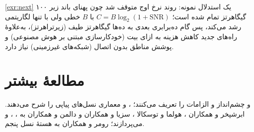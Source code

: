\documentclass[11pt,a4paper]{article}
\begin{document}
\begin{solutionbox}{\ref{exr:next}}
یک استدلال نمونه: روند نرخ اوج متوقف شد چون پهنای باند زیر ۱۰۰ گیگاهرتز تمام شده است؛ $C = B\log_2(1+\mathrm{SNR})$ با $B$ خطی ولی با  تنها
لگاریتمی رشد می‌کند، پس گام ده‌برابری بعدی به ده‌ها گیگاهرتز طیف (زیرتراهرتز)، به‌علاوهٔ راه‌های جدید کاهش هزینه به ازای بیت (خودکارسازی مبتنی بر
هوش مصنوعی) و پوشش مناطق بدون اتصال (شبکه‌های غیرزمینی) نیاز دارد.
\end{solutionbox}

\section{مطالعهٔ بیشتر}
 \cite{itu2015m2083} و  \cite{itu2017m2410} چشم‌انداز و الزامات  را تعریف می‌کنند؛  \cite{ts23002}،
 \cite{ts23401} و  \cite{ts23501} معماری نسل‌های پیاپی را شرح می‌دهند. ابرشپخر و همکاران \cite{eberspaecher2009gsm}، هولما و
توسکالا \cite{holma2010wcdma}، سزیا و همکاران \cite{sesia2011lte} و دالمن و همکاران \cite{dahlman2020nr} به ، ،  و 
می‌پردازند؛ رومر و همکاران \cite{rommer2020core} به هستهٔ نسل پنجم.

\begin{latin}
\printbibliography[heading=subbibliography,title={References}]
\end{latin}
\end{document}
